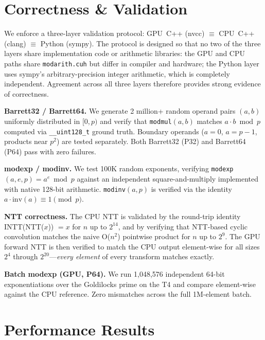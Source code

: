 \documentclass[conference]{IEEEtran}
\begin{document}
\section{Correctness \& Validation}\label{sec:val}

We enforce a three-layer validation protocol:
GPU~C++ (nvcc) $\equiv$ CPU~C++ (clang) $\equiv$ Python (sympy). The protocol
is designed so that no two of the three layers share implementation code or
arithmetic libraries: the GPU and CPU paths share \texttt{modarith.cuh} but
differ in compiler and hardware; the Python layer uses sympy's arbitrary-precision
integer arithmetic, which is completely independent. Agreement across all three
layers therefore provides strong evidence of correctness.

\textbf{Barrett32 / Barrett64.} We generate 2 million+ random operand pairs
$(a, b)$ uniformly distributed in $[0, p)$ and verify that \texttt{modmul}$(a,
b)$ matches $a \cdot b \bmod p$ computed via \texttt{\_\_uint128\_t} ground truth.
Boundary operands ($a = 0$, $a = p-1$, products near $p^2$) are tested
separately. Both Barrett32 (P32) and Barrett64 (P64) pass with zero failures.

\textbf{modexp / modinv.} We test 100K random exponents, verifying
\texttt{modexp}$(a, e, p) = a^e \bmod p$ against an independent square-and-multiply
implemented with native 128-bit arithmetic. \texttt{modinv}$(a, p)$ is verified
via the identity $a \cdot \text{inv}(a) \equiv 1 \pmod{p}$.

\textbf{NTT correctness.} The CPU NTT is validated by the round-trip identity
INTT(NTT($x$)) $= x$ for $n$ up to $2^{14}$, and by verifying that
NTT-based cyclic convolution matches the naive O($n^2$) pointwise product for
$n$ up to $2^9$. The GPU forward NTT is then verified to match the CPU output
element-wise for all sizes $2^4$ through $2^{20}$---\emph{every element} of
every transform matches exactly.

\textbf{Batch modexp (GPU, P64).} We run 1,048,576 independent 64-bit
exponentiations over the Goldilocks prime on the T4 and compare element-wise
against the CPU reference. Zero mismatches across the full 1M-element batch.

\section{Performance Results}
\end{document}
